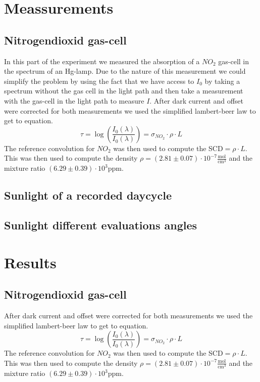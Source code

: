 \documentclass[12pt, english]{scrartcl} %
\begin{document}
\begin{multicols}{2}
\section{Meassurements}
\subsection{Nitrogendioxid gas-cell}
In this part of the experiment we measured the absorption of a $NO_2$ gas-cell in the spectrum of an Hg-lamp. Due to the nature of this measurement we could simplify the problem by using the fact that we have access to $I_0$ by taking a spectrum without the gas cell in the light path and then take a measurement with the gas-cell in the light path to measure $I$. After dark current and offset were corrected for both measurements we used the simplified lambert-beer law to get to equation.
\begin{equation}
\tau = \log(\frac{I_0(\lambda)}{I_0(\lambda)})= \sigma_{NO_2} \cdot \rho \cdot L
\end{equation}
The reference convolution for $NO_2$ was then used to compute the SCD$= \rho \cdot L$. This was then used to compute the density $\rho = (2.81 \pm 0.07 ) \cdot 10^{-7} \frac{\text{mol}}{\text{cm}^3}$ and the mixture ratio $(6.29 \pm 0.39) \cdot 10^3 \text{ppm}$.
\subsection{Sunlight of a recorded daycycle}

\subsection{Sunlight different evaluations angles}

\section{Results}
\subsection{Nitrogendioxid gas-cell}
After dark current and offset were corrected for both measurements we used the simplified lambert-beer law to get to equation.
\begin{equation}
\tau = \log(\frac{I_0(\lambda)}{I_0(\lambda)})= \sigma_{NO_2} \cdot \rho \cdot L
\end{equation}
The reference convolution for $NO_2$ was then used to compute the SCD$= \rho \cdot L$. This was then used to compute the density $\rho = (2.81 \pm 0.07 ) \cdot 10^{-7} \frac{\text{mol}}{\text{cm}^3}$ and the mixture ratio $(6.29 \pm 0.39) \cdot 10^3 \text{ppm}$.



\end{multicols}
\end{document}
